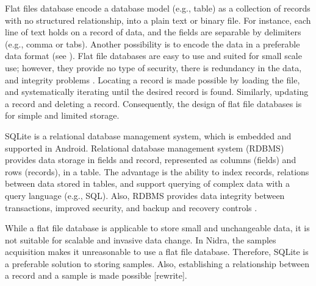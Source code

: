 Flat files database encode a database model (e.g., table) as a collection of records with no structured relationship, into a plain text or binary file. For instance, each line of text holds on a record of data, and the fields are separable by delimiters (e.g., comma or tabs). Another possibility is to encode the data in a preferable data format (see ). Flat file databases are easy to use and suited for small scale use; however, they provide no type of security, there is redundancy in the data, and integrity problems \cite{flatfilerdbms}. Locating a record is made possible by loading the file, and systematically iterating until the desired record is found. Similarly, updating a record and deleting a record. Consequently, the design of flat file databases is for simple and limited storage.

SQLite is a relational database management system, which is embedded and supported in Android. Relational database management system (RDBMS) provides data storage in fields and record, represented as columns (fields) and rows (records), in a table. The advantage is the ability to index records, relations between data stored in tables, and support querying of complex data with a query language (e.g., SQL). Also, RDBMS provides data integrity between transactions, improved security, and backup and recovery controls \cite{flatfilerdbms}. 

While a flat file database is applicable to store small and unchangeable data, it is not suitable for scalable and invasive data change. In Nidra, the samples acquisition makes it unreasonable to use a flat file database. Therefore, SQLite is a preferable solution to storing samples. Also, establishing a relationship between a record and a sample is made possible [rewrite]. 

